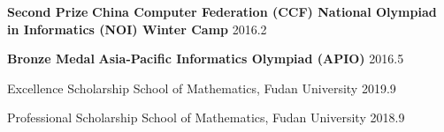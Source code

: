 



\begin{cvhonors}


  \cvhonor
    {\textbf{Second Prize}} %
    {\textbf{China Computer Federation (CCF) National Olympiad in Informatics (NOI) Winter Camp}} %
    {} %
    {2016.2} %

  \cvhonor
    {\textbf{Bronze Medal}} %
    {\textbf{Asia-Pacific Informatics Olympiad (APIO)}} %
    {} %
    {2016.5} %

  \cvhonor
    {Excellence Scholarship} %
    {School of Mathematics, Fudan University} %
    {} %
    {2019.9} %

  \cvhonor
    {Professional Scholarship} %
    {School of Mathematics, Fudan University} %
    {} %
    {2018.9} %

\end{cvhonors}

